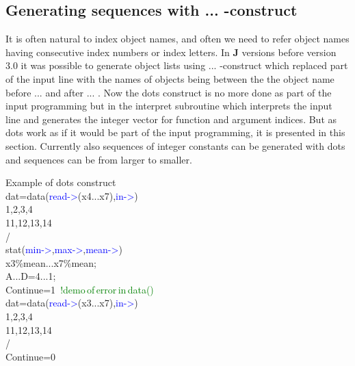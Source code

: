 \subsection{Generating sequences with ... -construct}
\label{dots}
It is often natural to index object names, and often we need to refer object
names having consecutive index numbers or index letters. In \textbf{J} versions before version 3.0 it
was possible to generate object lists using ... -construct which replaced part of
the input line with the names of objects being between the the object
name before ... and after ... . Now the dots construct is no more done as
part of the input programming but in the interpret subroutine which interprets the
input line and generates the integer vector for function and argument indices.
But as dots work as if it would be part of the input programming, it is presented in this
section. Currently also sequences of integer constants can be generated with dots and
sequences can be from larger to smaller.
\begin{example}[dotsex]Example of dots construct\\
\label{dotsex}
dat=\textcolor{VioletRed}{data}(\textcolor{blue}{read->}(x4...x7),\textcolor{blue}{in->})\\
1,2,3,4\\
11,12,13,14\\
/\\
\textcolor{VioletRed}{stat}(\textcolor{blue}{min->},\textcolor{blue}{max->},\textcolor{blue}{mean->})\\
x3\%mean...x7\%mean;\\
A...D=4...1;\\
Continue=1 \,\textcolor{green}{!demo\,of\,error\,in\,\textcolor{VioletRed}{data}()}\\
dat=\textcolor{VioletRed}{data}(\textcolor{blue}{read->}(x3...x7),\textcolor{blue}{in->})\\
1,2,3,4\\
11,12,13,14\\
/\\
Continue=0
\end{example}
